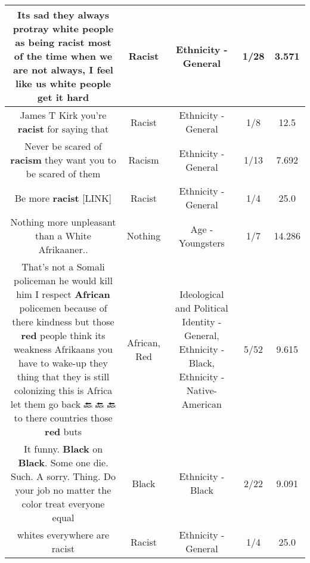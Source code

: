 \documentclass[11pt]{article}
\newlength\mylength
\begin{document}
\begin{center}
\begin{longtable}{|C{.65\mylength}|C{.30\mylength}|C{.12\mylength}|C{.12\mylength}|C{.12\mylength}|}
  \small Its sad they always protray white people as being \textbf{racist} most of the time when we are not always, I feel like us white people get it hard\normalsize   & Racist & Ethnicity - General & 1/28 & 3.571 \\  \hline
  \small James T Kirk you're \textbf{racist} for saying that\normalsize   & Racist & Ethnicity - General & 1/8 & 12.5 \\  \hline
  \small Never be scared of \textbf{racism} they want you to be scared of them\normalsize   & Racism & Ethnicity - General & 1/13 & 7.692 \\  \hline
  \small Be more \textbf{racist}  [LINK] \normalsize   & Racist & Ethnicity - General & 1/4 & 25.0 \\  \hline
  \small Nothing more unpleasant than a White Afrikaaner..\normalsize   & Nothing & Age - Youngsters & 1/7 & 14.286 \\  \hline
  \small That's not a Somali policeman he would kill him I respect \textbf{African} policemen because of there kindness but those \textbf{r\textbf{ed}} people think its weakness Afrikaans you have to wake-up they thing that they is still colonizing this is Africa let them go back 🔙 🔙 🔙 to there countries those \textbf{r\textbf{ed}} buts\normalsize   & African, Red &  Ideological and Political Identity - General, Ethnicity - Black, Ethnicity - Native-American & 5/52 & 9.615 \\  \hline
  \small It funny. \textbf{Black} on \textbf{Black}. Some one die. Such. A sorry. Thing. Do your job no matter the color treat everyone equal\normalsize   & Black & Ethnicity - Black & 2/22 & 9.091 \\  \hline
  \small whites everywhere are racist\normalsize   & Racist & Ethnicity - General & 1/4 & 25.0 \\  \hline

\end{longtable}
\end{center}
\end{document}
